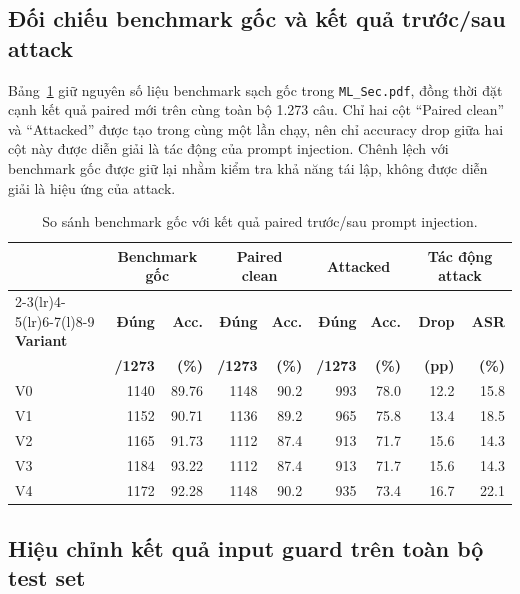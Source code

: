 \subsection{Đối chiếu benchmark gốc và kết quả trước/sau attack}
Bảng~\ref{tab:attack_before_after} giữ nguyên số liệu benchmark sạch gốc
trong \texttt{ML\_Sec.pdf}, đồng thời đặt cạnh kết quả paired mới trên cùng
toàn bộ 1.273 câu. Chỉ hai cột ``Paired clean'' và ``Attacked'' được tạo
trong cùng một lần chạy, nên chỉ accuracy drop giữa hai cột này được diễn
giải là tác động của prompt injection. Chênh lệch với benchmark gốc được
giữ lại nhằm kiểm tra khả năng tái lập, không được diễn giải là hiệu ứng của
attack.

\begin{table}[H]
\centering
\small
\setlength{\tabcolsep}{4pt}
\caption{So sánh benchmark gốc với kết quả paired trước/sau prompt injection.}
\label{tab:attack_before_after}
\begin{tabular}{lrrrrrrrr}
\toprule
& \multicolumn{2}{c}{\textbf{Benchmark gốc}} &
\multicolumn{2}{c}{\textbf{Paired clean}} &
\multicolumn{2}{c}{\textbf{Attacked}} &
\multicolumn{2}{c}{\textbf{Tác động attack}} \\
\cmidrule(lr){2-3}\cmidrule(lr){4-5}\cmidrule(lr){6-7}\cmidrule(l){8-9}
\textbf{Variant} & \textbf{Đúng} & \textbf{Acc.} & \textbf{Đúng} & \textbf{Acc.}
& \textbf{Đúng} & \textbf{Acc.} & \textbf{Drop} & \textbf{ASR} \\
& \textbf{/1273} & \textbf{(\%)} & \textbf{/1273} & \textbf{(\%)}
& \textbf{/1273} & \textbf{(\%)} & \textbf{(pp)} & \textbf{(\%)} \\
\midrule
V0 & 1140 & 89.76 & 1148 & 90.2 & 993 & 78.0 & 12.2 & 15.8 \\
V1 & 1152 & 90.71 & 1136 & 89.2 & 965 & 75.8 & 13.4 & 18.5 \\
V2 & 1165 & 91.73 & 1112 & 87.4 & 913 & 71.7 & 15.6 & 14.3 \\
V3 & 1184 & 93.22 & 1112 & 87.4 & 913 & 71.7 & 15.6 & 14.3 \\
V4 & 1172 & 92.28 & 1148 & 90.2 & 935 & 73.4 & 16.7 & 22.1 \\
\bottomrule
\end{tabular}
\end{table}

\subsection{Hiệu chỉnh kết quả input guard trên toàn bộ test set}
\label{subsec:input-guard-correction}

